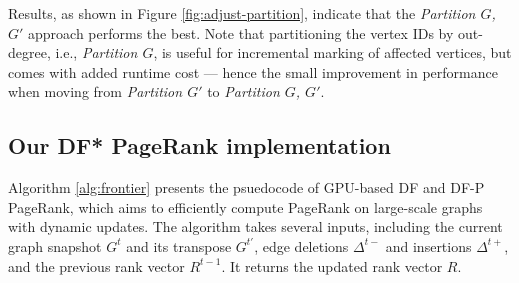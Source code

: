 Results, as shown in Figure \ref{fig:adjust-partition}, indicate that the \textit{Partition $G$, $G'$} approach performs the best. Note that partitioning the vertex IDs by out-degree, i.e., \textit{Partition $G$}, is useful for incremental marking of affected vertices, but comes with added runtime cost --- hence the small improvement in performance when moving from \textit{Partition $G'$} to \textit{Partition $G$, $G'$}.










\subsection{Our DF* PageRank implementation}

Algorithm \ref{alg:frontier} presents the psuedocode of GPU-based DF and DF-P PageRank, which aims to efficiently compute PageRank on large-scale graphs with dynamic updates. The algorithm takes several inputs, including the current graph snapshot $G^t$ and its transpose $G^{t'}$, edge deletions $\Delta^{t-}$ and insertions $\Delta^{t+}$, and the previous rank vector $R^{t-1}$. It returns the updated rank vector $R$.


